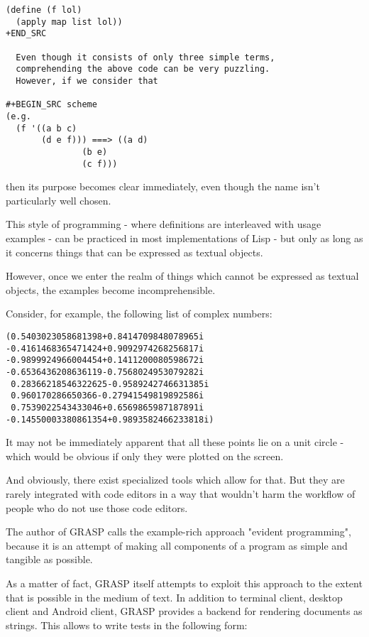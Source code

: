 \documentclass[11pt]{article}
\begin{document}
\begin{verbatim}
(define (f lol)
  (apply map list lol))
+END_SRC

  Even though it consists of only three simple terms,
  comprehending the above code can be very puzzling.
  However, if we consider that

#+BEGIN_SRC scheme
(e.g.
  (f '((a b c)
       (d e f))) ===> ((a d)
		       (b e)
		       (c f)))
\end{verbatim}

then its purpose becomes clear immediately, even though
the name isn't particularly well chosen.

This style of programming - where definitions are
interleaved with usage examples - can be practiced
in most implementations of Lisp - but only as long
as it concerns things that can be expressed
as textual objects. 

However, once we enter the realm of things which cannot
be expressed as textual objects, the examples become
incomprehensible.

Consider, for example, the following list of complex numbers:

\begin{verbatim}
(0.5403023058681398+0.8414709848078965i 
-0.4161468365471424+0.9092974268256817i
-0.9899924966004454+0.1411200080598672i
-0.6536436208636119-0.7568024953079282i
 0.28366218546322625-0.9589242746631385i 
 0.960170286650366-0.27941549819892586i
 0.7539022543433046+0.6569865987187891i
-0.14550003380861354+0.9893582466233818i)
\end{verbatim}

It may not be immediately apparent that all these points
lie on a unit circle - which would be obvious if only they
were plotted on the screen.

And obviously, there exist specialized tools
which allow for that. But they are rarely integrated
with code editors in a way that wouldn't harm
the workflow of people who do not use those code
editors.

The author of GRASP calls the example-rich approach
"evident programming", because it is an attempt
of making all components of a program as simple
and tangible as possible.

As a matter of fact, GRASP itself attempts to exploit
this approach to the extent that is possible
in the medium of text. In addition to terminal
client, desktop client and Android client,
GRASP provides a backend for rendering documents
as strings. This allows to write tests in the
following form:
\end{document}
